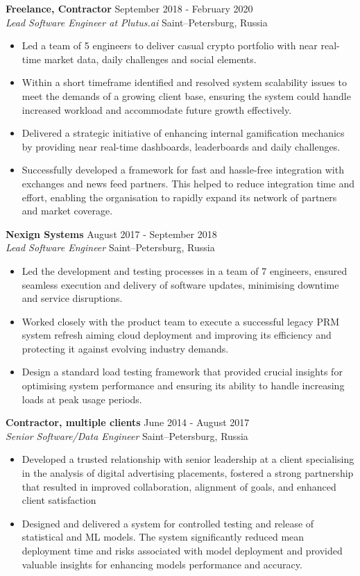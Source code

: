 \documentclass[a4paper]{article}
\newcommand{\employer} [4] {
    \textbf{#1} \hfill {#3} \\
    \textit{#2} \hfill {#4} \\
    \vspace{0mm}
}
\begin{document}
    \employer{Freelance, Contractor}{Lead Software Engineer at Plutus.ai}{September 2018 - February 2020}{Saint–Petersburg, Russia}
    \begin{itemize}[itemsep=-1mm]
        \item Led a team of 5 engineers to deliver casual crypto portfolio with near real-time market data, daily challenges and social elements.
        \item Within a short timeframe identified and resolved system scalability issues to meet the demands of a growing client base,
        ensuring the system could handle increased workload and accommodate future growth effectively.
        \item Delivered a strategic initiative of enhancing internal gamification mechanics by providing near real-time dashboards, leaderboards
        and daily challenges.
        \item Successfully developed a framework for fast and hassle-free integration with exchanges and news feed partners.
        This helped to reduce integration time and effort, enabling the organisation to rapidly expand its network of partners and market coverage.
    \end{itemize}

    \employer{Nexign Systems}{Lead Software Engineer}{August 2017 - September 2018}{Saint–Petersburg, Russia}
    \begin{itemize}[itemsep=-1mm]
        \item Led the development and testing processes in a team of 7 engineers, ensured seamless execution
        and delivery of software updates, minimising downtime and service disruptions.
        \item Worked closely with the product team to execute a successful legacy PRM system refresh aiming cloud deployment and
        improving its efficiency and protecting it against evolving industry demands.
        \item Design a standard load testing framework that provided crucial insights for optimising system
        performance and ensuring its ability to handle increasing loads at peak usage periods.
    \end{itemize}

    \employer{Contractor, multiple clients}{Senior Software/Data Engineer}{June 2014 - August 2017}{Saint–Petersburg, Russia}
    \begin{itemize}[itemsep=-1mm]
        \item Developed a trusted relationship with senior leadership at a client specialising in the analysis of digital advertising
        placements, fostered a strong partnership that resulted in improved collaboration, alignment of goals, and enhanced client
        satisfaction
        \item Designed and delivered a system for controlled testing and release of statistical and ML models. The system significantly
        reduced mean deployment time and risks associated with model deployment and provided valuable insights for enhancing
        models performance and accuracy.
    \end{itemize}
\end{document}
